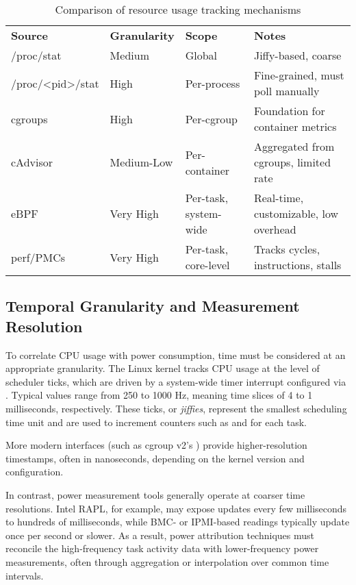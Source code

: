 \begin{table}[h]
    \small
    \centering
    \begin{tabular}{ |L{3.2cm} | L{2cm}| L{3.6cm} | L{4cm} | }
        \hline
        \textbf{Source} & \textbf{Granularity} & \textbf{Scope} & \textbf{Notes} \\
        \Xhline{1.5pt}
        /proc/stat & Medium & Global & Jiffy-based, coarse \\
        \hline
        /proc/\textless pid\textgreater/stat & High & Per-process & Fine-grained, must poll manually \\
        \hline
        cgroups & High & Per-cgroup & Foundation for container metrics \\
        \hline
        cAdvisor & Medium-Low & Per-container & Aggregated from cgroups, limited rate \\
        \hline
        eBPF & Very High & Per-task, system-wide & Real-time, customizable, low overhead \\
        \hline
        perf/PMCs & Very High & Per-task, core-level & Tracks cycles, instructions, stalls \\
        \hline
    \end{tabular}
    \caption{Comparison of resource usage tracking mechanisms}
    \label{tab:resource-tracking-comparison}
\end{table}

\subsection{Temporal Granularity and Measurement Resolution}
\label{sec:granularity}

To correlate CPU usage with power consumption, time must be considered at an appropriate granularity. The Linux kernel tracks CPU usage at the level of scheduler ticks, which are driven by a system-wide timer interrupt configured via . Typical values range from 250 to 1000 Hz, meaning time slices of 4 to 1 milliseconds, respectively. These ticks, or \emph{jiffies}, represent the smallest scheduling time unit and are used to increment counters such as  and  for each task.

More modern interfaces (such as cgroup v2’s ) provide higher-resolution timestamps, often in nanoseconds, depending on the kernel version and configuration.

In contrast, power measurement tools generally operate at coarser time resolutions. Intel RAPL, for example, may expose updates every few milliseconds to hundreds of milliseconds, while BMC- or IPMI-based readings typically update once per second or slower. As a result, power attribution techniques must reconcile the high-frequency task activity data with lower-frequency power measurements, often through aggregation or interpolation over common time intervals.

